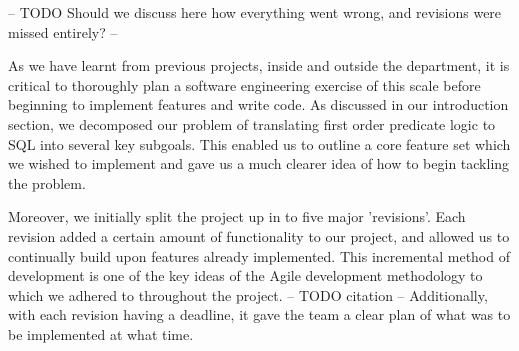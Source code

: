 \documentclass[a4wide, 11pt]{article} \usepackage{a4, fullpage}
\begin{document}
-- TODO Should we discuss here how everything went wrong, and revisions were
missed entirely? --

As we have learnt from previous projects, inside and outside the department, it
is critical to thoroughly plan a software engineering exercise of this scale
before beginning to implement features and write code. As discussed in our
introduction section, we decomposed our problem of translating first order
predicate logic to SQL into several key subgoals. This enabled us to outline a
core feature set which we wished to implement and gave us a much clearer idea
of how to begin tackling the problem.

Moreover, we initially split the project up in to five major 'revisions'. Each
revision added a certain amount of functionality to our project, and allowed us
to continually build upon features already implemented. This incremental method
of development is one of the key ideas of the Agile development methodology to
which we adhered to throughout the project. -- TODO citation -- Additionally,
with each revision having a deadline, it gave the team a clear plan of what was
to be implemented at what time.
\end{document}
